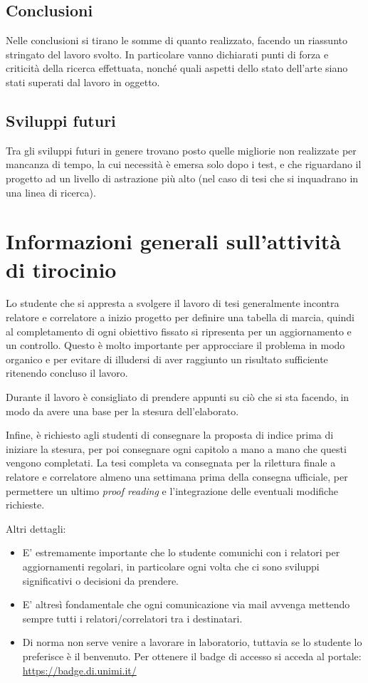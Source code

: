 \documentclass[12pt]{report}
\begin{document}
\section{Conclusioni}

Nelle conclusioni si tirano le somme di quanto realizzato, facendo un riassunto stringato del lavoro svolto. In particolare vanno dichiarati punti di forza e criticità della ricerca effettuata, nonché quali aspetti dello stato dell'arte siano stati superati dal lavoro in oggetto.

\section{Sviluppi futuri}

Tra gli sviluppi futuri in genere trovano posto quelle migliorie non realizzate per mancanza di tempo, la cui necessità è emersa solo dopo i test, e che riguardano il progetto ad un livello di astrazione più alto (nel caso di tesi che si inquadrano in una linea di ricerca).


%
%

\appendix

\chapter{Informazioni generali sull'attività di tirocinio}
Lo studente che si appresta a svolgere il lavoro di tesi generalmente incontra relatore e correlatore a inizio progetto per definire una tabella di marcia, quindi al completamento di ogni obiettivo fissato si ripresenta per un aggiornamento e un controllo. Questo è molto importante per approcciare il problema in modo organico e per evitare di illudersi di aver raggiunto un risultato sufficiente ritenendo concluso il lavoro.

Durante il lavoro è consigliato di prendere appunti su ciò che si sta facendo, in modo da avere una base per la stesura dell'elaborato.

Infine, è richiesto agli studenti di consegnare la proposta di indice prima di iniziare la stesura, per poi consegnare ogni capitolo a mano a mano che questi vengono completati. La tesi completa va consegnata per la rilettura finale a relatore e correlatore almeno una settimana prima della consegna ufficiale, per permettere un ultimo \textit{proof reading} e l'integrazione delle eventuali modifiche richieste.

Altri dettagli:
\begin{itemize}
    \item E' estremamente importante che lo studente comunichi con i relatori per aggiornamenti regolari, in particolare ogni volta che ci sono sviluppi significativi o decisioni da prendere.
    \item E' altresì fondamentale che ogni comunicazione via mail avvenga mettendo sempre tutti i relatori/correlatori tra i destinatari.
    \item Di norma non serve venire a lavorare in laboratorio, tuttavia se lo studente lo preferisce è il benvenuto. Per ottenere il badge di accesso si acceda al portale: \url{https://badge.di.unimi.it/}
\end{itemize}
\end{document}
